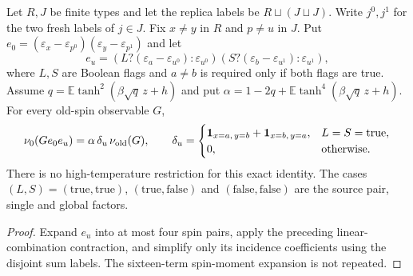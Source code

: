 \begin{lemma}
\label{lem:sg-tal:fresh-factor-contraction}
\leanok
{}
Let $R,J$ be finite types and let the replica labels be $R\sqcup(J\sqcup J)$.
Write $j^0,j^1$ for the two fresh labels of $j\in J$. Fix $x\ne y$ in $R$ and
$p\ne u$ in $J$. Put $e_0=(\varepsilon_x-\varepsilon_{p^0})
(\varepsilon_y-\varepsilon_{p^1})$ and let
\[
 e_u=(L?(\varepsilon_a-\varepsilon_{u^0}):\varepsilon_{u^0})
     (S?(\varepsilon_b-\varepsilon_{u^1}):\varepsilon_{u^1}),
\]
where $L,S$ are Boolean flags and $a\ne b$ is required only if both flags are true.
Assume $q=\mathbb E\tanh^2(\beta\sqrt q\,z+h)$ and put
$\alpha=1-2q+\mathbb E\tanh^4(\beta\sqrt q\,z+h)$. For every old-spin observable $G$,
\[
 \nu_0(G e_0 e_u)=\alpha\,\delta_u\,\nu_{\rm old}(G),\qquad
 \delta_u=\begin{cases}
 \mathbf1_{x=a,\,y=b}+\mathbf1_{x=b,\,y=a},&L=S=\mathrm{true},\\
 0,&\text{otherwise}.
 \end{cases}
\]
There is no high-temperature restriction for this exact identity. The cases
$(L,S)=(\mathrm{true},\mathrm{true})$, $(\mathrm{true},\mathrm{false})$ and
$(\mathrm{false},\mathrm{false})$ are the source pair, single and global factors.
\end{lemma}
\begin{proof}
\leanok
Expand $e_u$ into at most four spin pairs, apply the preceding linear-combination
contraction, and simplify only its incidence coefficients using the disjoint sum labels.
The sixteen-term spin-moment expansion is not repeated.
\end{proof}


